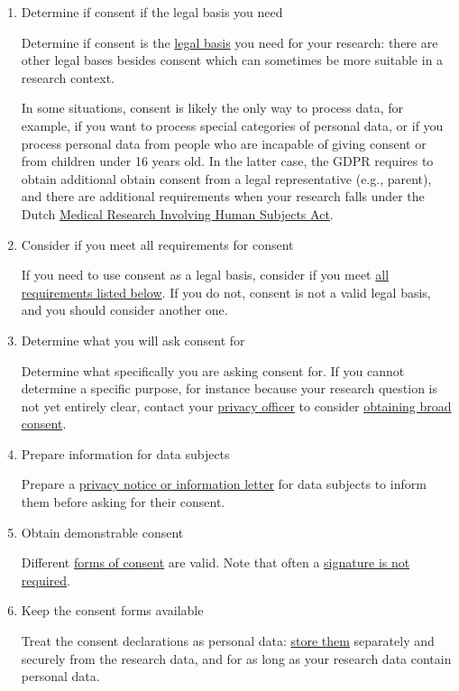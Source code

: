 \documentclass[
]{book}
\begin{document}
\begin{enumerate}
\def\labelenumi{\arabic{enumi}.}
\item
  Determine if consent if the legal basis you need

  Determine if consent is the \protect\hyperlink{legal-basis}{legal basis} you need for your
  research: there are other legal bases besides consent which can sometimes be
  more suitable in a research context.

  In some situations, consent is likely the only way to process data, for
  example, if you want to process
  \protect\hypertarget{special-types-personal-data}{}{special categories of personal data},
  or if you process personal data from people who are incapable of giving consent
  or from children under 16 years old. In the latter
  case, the GDPR requires to obtain additional obtain consent from a legal
  representative (e.g., parent), and there are additional requirements when your
  research falls under the Dutch
  \href{https://www.ccmo.nl/onderzoekers/aanvullende-informatie-over-bepaalde-soorten-onderzoek/onderzoek-bij-proefpersonen-jonger-dan-16-jaar-kinderen/toestemming}{Medical Research Involving Human Subjects Act}.
\item
  Consider if you meet all requirements for consent

  If you need to use consent as a legal basis, consider if you meet
  \protect\hyperlink{consent-requirements}{all requirements listed below}. If you do not,
  consent is not a valid legal basis, and you should consider another one.
\item
  Determine what you will ask consent for

  Determine what specifically you are asking consent for. If you cannot
  determine a specific purpose, for instance because your research question is
  not yet entirely clear, contact your \protect\hyperlink{support}{privacy officer}
  to consider \protect\hyperlink{broad-consent}{obtaining broad consent}.
\item
  Prepare information for data subjects

  Prepare a
  \protect\hyperlink{privacy-notices}{privacy notice or information letter}
  for data subjects to inform them before asking for their consent.
\item
  Obtain demonstrable consent

  Different \protect\hyperlink{forms-consent}{forms of consent} are valid. Note
  that often a \protect\hyperlink{to-sign-or-not-to-sign}{signature is not required}.
\item
  Keep the consent forms available

  Treat the consent declarations as personal data:
  \protect\hyperlink{demonstrate-consent}{store them} separately and securely from the
  research data, and for as long as your research data contain personal data.
\end{enumerate}
\end{document}
